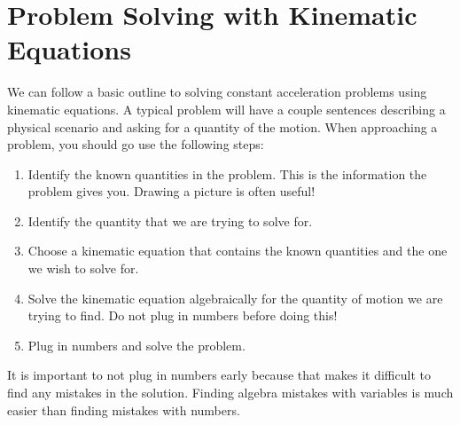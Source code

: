 \documentclass[12pt]{book}
\begin{document}
\newpage

\section{Problem Solving with Kinematic Equations}

We can follow a basic outline to solving constant acceleration problems using kinematic equations. A typical problem will have a couple sentences describing a physical scenario and asking for a quantity of the motion. When approaching a problem, you should go use the following steps:

\begin{enumerate}
\item Identify the known quantities in the problem. This is the information the problem gives you. Drawing a picture is often useful!

\item Identify the quantity that we are trying to solve for.

\item Choose a kinematic equation that contains the known quantities and the one we wish to solve for.

\item Solve the kinematic equation algebraically for the quantity of motion we are trying to find. Do not plug in numbers before doing this!

\item Plug in numbers and solve the problem.
\end{enumerate}

It is important to not plug in numbers early because that makes it difficult to find any mistakes in the solution. Finding algebra mistakes with variables is much easier than finding mistakes with numbers.
\end{document}
